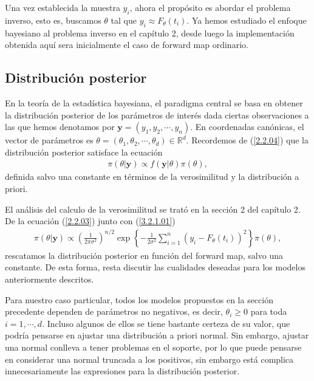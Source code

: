 Una vez establecida la muestra $y_i$, ahora el propósito es abordar el problema inverso, esto es, buscamos $\theta$ tal que $y_i \approx F_{\theta}(t_i)$. Ya hemos estudiado el enfoque bayesiano al problema inverso en el capítulo 2, desde luego la implementación obtenida aquí sera inicialmente el caso de forward map ordinario.

\subsection{Distribución posterior}

En la teoría de la estadística bayesiana, el paradigma central se basa en obtener la distribución posterior de los parámetros de interés dada ciertas observaciones a las que hemos denotamos por $\mathbf{y} = (y_1,y_2,\cdots, y_n)$. 
En coordenadas canónicas, el vector de parámetros es $\theta = (\theta_1,\theta_2, \cdots, \theta_d) \in \mathbb{R}^d$. Recordemos de (\ref{2.2.04}) que la distribución posterior satisface la ecuación  
\begin{align}
    \pi(\theta|\mathbf{y}) \propto f(\mathbf{y}|\theta) \pi(\theta),
    \label{3.2.1.01}
\end{align} 
definida salvo una constante en términos de la verosimilitud y la distribución a priori. 

El análisis del calculo de la verosimilitud se trató en la sección 2 del capítulo 2. De la ecuación (\ref{2.2.03}) junto con (\ref{3.2.1.01})
\begin{align}
    \pi(\theta|\mathbf{y}) \propto \left(\frac{1}{2\pi \sigma^2}\right) ^{n/2}\exp \left \{  -\frac{1}{2\sigma^2}\sum_{i = 1}^{n} \left(y_i - F_{\theta}(t_i)\right)^2 \right \} \pi(\theta),
    \label{3.2.1.02}
\end{align}
rescatamos la distribución posterior en función del forward map, salvo una constante. De esta forma, resta discutir las cualidades deseadas para los modelos anteriormente descritos.

Para nuestro caso particular, todos los modelos propuestos en la sección precedente dependen de parámetros no negativos, es decir, $\theta_i \geq 0$ para toda $i = 1,\cdots, d$. Incluso algunos de ellos se tiene bastante certeza de su valor, que podría pensarse en ajustar una distribución a priori normal. Sin embargo, ajustar una normal conlleva a tener problemas en el soporte, por lo que puede pensarse en considerar una normal truncada a los positivos, sin embargo está complica innecesariamente las expresiones para la distribución posterior. 

